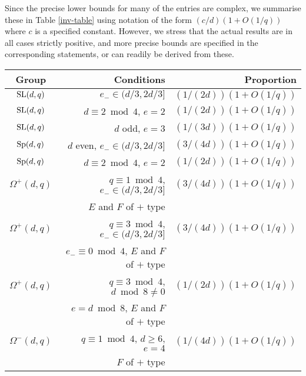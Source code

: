 \documentclass[12pt]{article}
\def\SL{{\rm SL}}
\def\Oh{O}  %
\def\Sp{{\rm Sp}}
\begin{document}
Since the precise lower bounds for many of the entries
are complex, we summarise these in 
Table \ref{inv-table} using notation of the form $(c / d)(1 + \Oh(1/q))$
where $c$ is a specified constant.
However, we stress that the actual results are in all cases strictly
positive, and more precise bounds are specified
in the corresponding statements, or can readily be derived from these.

\begin{table}[p]
\begin{center}
\begin{tabular}
{|c|r|r|} \hline
Group       & Conditions         & Proportion \rule{0cm}{3.0ex}\\ \hline
$\SL(d,q)$  & $e_-\in(d/3,2d/3]$  & $(1/(2d))(1+\Oh(1/q))$ \\ 
\hline 

$\SL(d,q)$ & $d\equiv2\bmod4$, $e=2$ & $(1/(2d))(1+\Oh(1/q))$  
\\ \hline 

$\SL(d,q)$ & $d$ odd,  $e=3$  & $(1/(3d))(1+\Oh(1/q))$  %
\rule{0cm}{3.0ex}\\ \hline

$\Sp(d,q)$ & $d$ even, $e_- \in (d/3,2d/3]$ & $(3/(4d))(1 + \Oh(1/q))$  
\rule{0cm}{3.0ex}\\ \hline

$\Sp(d,q)$ & $d\equiv2\bmod4$, $e=2$  &  $(1/(2d))(1+\Oh(1/q))$   
\rule{0cm}{3.0ex}\\ \hline

$\Omega^ +(d,q)$ & $q\equiv1\bmod4$, $e_- \in (d/3,2d/3]$
& $(3/(4d))(1 + \Oh(1/q))$  \\ 
& $E$ and $F$ of $+$ type & 
\rule{0cm}{3.0ex}\\ \hline

$\Omega^+(d,q)$ &  $q\equiv3\bmod4$,  
$e_- \in (d/3,2d/3]$
& $(3/(4d))(1 + \Oh(1/q))$  \\ 
& $e_-\equiv0\bmod4$, $E$ and $F$ of $+$ type &  
\rule{0cm}{3.0ex}\\ \hline

$\Omega^+(d,q)$ & $q\equiv3\bmod4$, $d\bmod8\ne0$ &
$(1/(2d))(1 + \Oh(1/q))$ \\ 
& $e=d\bmod8$, $E$ and $F$ of $+$ type &  
\rule{0cm}{3.0ex}\\ \hline

$\Omega^-(d,q)$ & $q\equiv1\bmod4$, $d\ge6$,  $e=4$ & 
$(1/(4d))(1+\Oh(1/q))$  \\ 
& $F$ of $+$ type  &  
\rule{0cm}{3.0ex}\\ \hline


\end{tabular}
\end{center}
\end{table}
\end{document}
